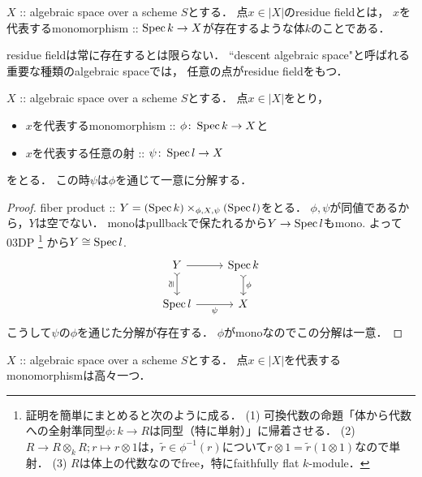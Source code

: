 \begin{Def}
    $X$ :: algebraic space over a scheme $S$とする．
    点$x \in |X|$のresidue fieldとは，
    $x$を代表するmonomorphism :: $\operatorname{Spec} k \to X$が存在するような体$k$のことである．
\end{Def}

\begin{Remark}
    residue fieldは常に存在するとは限らない．
    ``descent algebraic space"と呼ばれる重要な種類のalgebraic spaceでは，
    任意の点がresidue fieldをもつ．
\end{Remark}

\begin{Lemma}
    $X$ :: algebraic space over a scheme $S$とする．
    点$x \in |X|$をとり，
    \begin{itemize}
        \item $x$を代表するmonomorphism :: $\phi \colon \operatorname{Spec} k \to X$と
        \item $x$を代表する任意の射 :: $\psi \colon \operatorname{Spec} l \to X$
    \end{itemize}
    をとる．
    この時$\psi$は$\phi$を通じて一意に分解する．
\end{Lemma}
\begin{proof}
    fiber product :: $Y=(\operatorname{Spec} k) \times_{\phi, X, \psi} (\operatorname{Spec} l)$をとる．
    $\phi, \psi$が同値であるから，$Y$は空でない．
    monoはpullbackで保たれるから$Y \to \operatorname{Spec} l$もmono.
    よって\cite{SP} 03DP
    \footnote
    {
        証明を簡単にまとめると次のように成る．
        (1) 可換代数の命題「体から代数への全射準同型$\phi \colon k \to R$は同型（特に単射）」に帰着させる．
        (2) $R \to R \otimes_{k} R; r \mapsto r \otimes 1$は，$\tilde{r} \in \phi^{-1}(r)$について$r \otimes 1=\tilde{r} (1 \otimes 1)$なので単射．
        (3) $R$は体上の代数なのでfree，特にfaithfully flat $k$-module．
    }
    から$Y \cong \operatorname{Spec} l$.
    \[
    \begin{tikzcd}
        Y       \ar[r]\ar[d, tail, "\text{\rotatebox{90}{$\iso$}}"']&   \Spec k \ar[d, tail, "\phi"]\\
        \Spec l \ar[r, "\psi"']&                                         X
    \end{tikzcd}
    \]
    こうして$\psi$の$\phi$を通じた分解が存在する．
    $\phi$がmonoなのでこの分解は一意．
\end{proof}

\begin{Cor}
    $X$ :: algebraic space over a scheme $S$とする．
    点$x \in |X|$を代表するmonomorphismは高々一つ．
\end{Cor}

